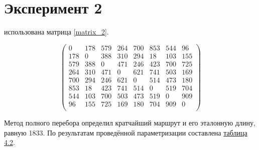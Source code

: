 \section{Эксперимент 2}
 использована матрица \ref{matrix_2}.

\begin{scriptsize} 
	\begin{equation}\label{matrix_2}
		\left(
		\begin{array}{cccccccc}
			  0& 178& 579& 264& 700& 853& 544& 96\\
			 178&  0& 388& 310& 294& 18& 103& 155\\
			 579& 388&  0& 471& 246& 423& 700& 725\\
			 264& 310& 471&  0& 621& 741& 503& 169\\
			 700& 294& 246& 621&  0& 514& 473& 180\\
			 853& 18& 423& 741& 514&  0& 519& 704\\
			 544& 103& 700& 503& 473& 519&  0& 909\\
			 96& 155& 725& 169& 180& 704& 909&  0\\
		\end{array}\right)
\end{equation} \end{scriptsize}

Метод полного перебора определил кратчайший маршрут и его эталонную длину, равную 1833. По результатам проведённой параметризации составлена \hyperref[table_2]{таблица 4.2}.


